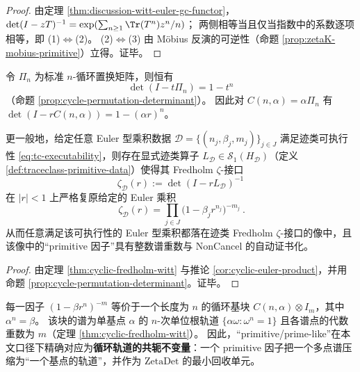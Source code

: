 \begin{proof}
由定理 \ref{thm:discussion-witt-euler-gc-functor}，
\(
\det(I-zT)^{-1}
=\exp(\sum_{n\ge 1}\Tr(T^n)z^n/n)
\)；
两侧相等当且仅当指数中的系数逐项相等，即 (1)\(\Longleftrightarrow\)(2)。
(2)\(\Longleftrightarrow\)(3) 由 Möbius 反演的可逆性（命题 \ref{prop:zetaK-mobius-primitive}）立得。证毕。
\end{proof}

\begin{theorem}\label{thm:discussion-traceclass-fredholm-euler-surjection}
令 \(\Pi_n\) 为标准 \(n\)-循环置换矩阵，则恒有
\[
\det(I-t\Pi_n)=1-t^n
\]
（命题 \ref{prop:cycle-permutation-determinant}）。
因此对 \(C(n,\alpha)=\alpha\Pi_n\) 有
\(\det(I-rC(n,\alpha))=1-(\alpha r)^n\)。
\par
更一般地，给定任意 Euler 型乘积数据 \(\mathcal D=\{(n_j,\beta_j,m_j)\}_{j\in J}\) 满足迹类可执行性 \eqref{eq:tc-executability}，则存在显式迹类算子 \(L_{\mathcal D}\in\mathcal{S}_1(H_{\mathcal D})\)（定义 \ref{def:traceclass-primitive-data}）使得其 Fredholm \(\zeta\)-接口
\[
\zeta_{\mathcal D}(r):=\det(I-rL_{\mathcal D})^{-1}
\]
在 \(|r|<1\) 上严格复原给定的 Euler 乘积
\[
\boxed{\ \zeta_{\mathcal D}(r)=\prod_{j\in J}\bigl(1-\beta_j r^{n_j}\bigr)^{-m_j}\ }.
\]
从而任意满足该可执行性的 Euler 型乘积都落在迹类 Fredholm \(\zeta\)-接口的像中，且该像中的“primitive 因子”具有整数谱重数与 NonCancel 的自动证书化。
\end{theorem}

\begin{proof}
由定理 \ref{thm:cyclic-fredholm-witt} 与推论 \ref{cor:cyclic-euler-product}，并用命题 \ref{prop:cycle-permutation-determinant}。证毕。
\end{proof}

\begin{corollary}[Euler 因子 \(=\) 单基点单位根轨道（primitive 原子）]\label{cor:discussion-euler-factor-is-basepoint-orbit}
每一因子 \((1-\beta r^{n})^{-m}\) 等价于一个长度为 \(n\) 的循环基块 \(C(n,\alpha)\otimes I_m\)，其中 \(\alpha^n=\beta\)。
该块的谱为单基点 \(\alpha\) 的 \(n\)-次单位根轨道
\(
\{\alpha\omega:\omega^n=1\}
\)
且各谱点的代数重数为 \(m\)（定理 \ref{thm:cyclic-fredholm-witt}）。
因此，“primitive/prime-like”在本文口径下精确对应为\textbf{循环轨道的共轭不变量}：一个 primitive 因子把一个多点谱压缩为“一个基点的轨道”，并作为 \(\mathrm{ZetaDet}\) 的最小回收单元。
\end{corollary}

